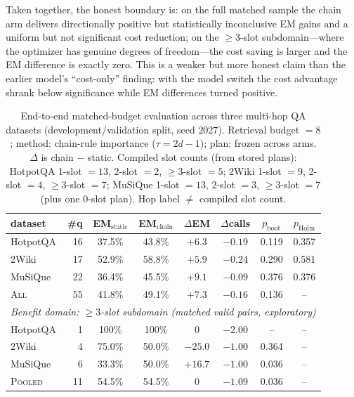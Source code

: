 Taken together, the honest boundary is: on the full matched sample the chain
arm delivers directionally positive but statistically inconclusive EM gains
and a uniform but not significant cost reduction; on the $\ge 3$-slot
subdomain---where the optimizer has genuine degrees of freedom---the cost
saving is larger and the EM difference is exactly zero. This is a weaker but
more honest claim than the earlier model's ``cost-only'' finding: with the
model switch the cost advantage shrank below significance while EM differences
turned positive.

\begin{table}[t]
\centering
\caption{End-to-end matched-budget evaluation across three multi-hop QA
datasets (development/validation split, seed $2027$). Retrieval budget $=8$;
method: chain-rule importance ($\tau = 2d - 1$); plan: frozen across arms.
$\Delta$ is chain $-$ static. Compiled slot counts (from stored plans): HotpotQA
1-slot $=13$, 2-slot $=2$, $\ge 3$-slot $=5$; 2Wiki
1-slot $=9$, 2-slot $=4$, $\ge 3$-slot $=7$; MuSiQue 1-slot $=13$,
2-slot $=3$, $\ge 3$-slot $=7$ (plus one 0-slot plan). Hop label $\ne$ compiled slot count.}
\label{tab:overall}
\small
\begin{tabular}{lrcccccc}
\toprule
dataset & \#q & EM$_{\text{static}}$ & EM$_{\text{chain}}$ & $\Delta$EM & $\Delta$calls & $p_{\text{boot}}$ & $p_{\text{Holm}}$ \\
\midrule
HotpotQA  & 16 & 37.5\% & 43.8\% & $+6.3$ & $-0.19$ & 0.119 & 0.357 \\
2Wiki     & 17 & 52.9\% & 58.8\% & $+5.9$ & $-0.24$ & 0.290 & 0.581 \\
MuSiQue   & 22 & 36.4\% & 45.5\% & $+9.1$ & $-0.09$ & 0.376 & 0.376 \\
\midrule
\textsc{All}    & 55 & 41.8\% & 49.1\% & $+7.3$ & $-0.16$ & 0.136 & -- \\
\midrule
\multicolumn{8}{l}{\textit{Benefit domain: $\ge 3$-slot subdomain (matched valid pairs, exploratory)}} \\
\midrule
HotpotQA  & 1 & 100\% & 100\% & $0$  & $-2.00$ & -- & -- \\
2Wiki     & 4 & 75.0\% & 50.0\% & $-25.0$ & $-1.00$ & 0.364 & -- \\
MuSiQue   & 6 & 33.3\% & 50.0\% & $+16.7$ & $-1.00$ & 0.036 & -- \\
\midrule
\textsc{Pooled} & 11 & 54.5\% & 54.5\% & $0$ & $-1.09$ & 0.036 & -- \\
\bottomrule
\end{tabular}


\end{table}
